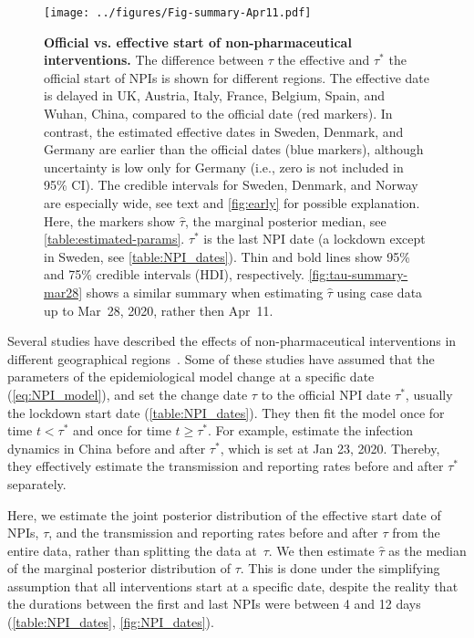\documentclass[12pt]{extarticle}
\begin{document}
\begin{figure}[b!]
    \centering
	\texttt{[image: ../figures/Fig-summary-Apr11.pdf]}	
    \caption{
    \textbf{Official vs. effective start of non-pharmaceutical interventions.}
    	The difference between $\tau$ the effective and $\tau^*$ the official start of NPIs is shown for different regions. The effective date is delayed in UK, Austria, Italy, France, Belgium, Spain, and Wuhan, China, compared to the official date (red markers). In contrast, the estimated effective dates in Sweden, Denmark, and Germany are earlier than the official dates (blue markers), although uncertainty is low only for Germany (i.e., zero is not included in 95\% CI). The credible intervals for Sweden, Denmark, and Norway are especially wide, see text and \autoref{fig:early} for possible explanation.
	Here, the markers show $\hat{\tau}$, the marginal posterior median, see \autoref{table:estimated-params}. $\tau^*$ is the last NPI date (a lockdown except in Sweden, see \autoref{table:NPI_dates}). Thin and bold lines show 95\% and 75\% credible intervals (HDI), respectively. \autoref{fig:tau-summary-mar28} shows a similar summary when estimating $\hat{\tau}$ using case data up to Mar~28, 2020, rather then Apr~11.
    }
    \label{fig:tau-summary}
\end{figure}



Several studies have described the effects of non-pharmaceutical interventions in different geographical regions~\citep{Flaxman2020,Gatto2020,Li2020}. 
Some of these studies have assumed that the parameters of the epidemiological model change at a specific date (\autoref{eq:NPI_model}), and set the change date $\tau$ to the official NPI date $\tau^*$, usually the lockdown start date (\autoref{table:NPI_dates}).
They then fit the model once for time $t<\tau^*$ and once for time $t \ge \tau^*$.
For example, \citet{Li2020} estimate the infection dynamics in China before and after $\tau^*$, which is set at Jan 23, 2020. Thereby, they effectively estimate the transmission and reporting rates before and after $\tau^*$ separately.

Here, we estimate the joint posterior distribution of the effective start date of NPIs, $\tau$, and the transmission and reporting rates before and after $\tau$ from the entire data, rather than splitting the data at~$\tau$. 
We then estimate $\hat{\tau}$ as the median of the marginal posterior distribution of $\tau$.
This is done under the simplifying assumption that all interventions start at a specific date, despite the reality that the durations between the first and last NPIs were between 4 and 12 days (\autoref{table:NPI_dates}, \autoref{fig:NPI_dates}).
\end{document}
